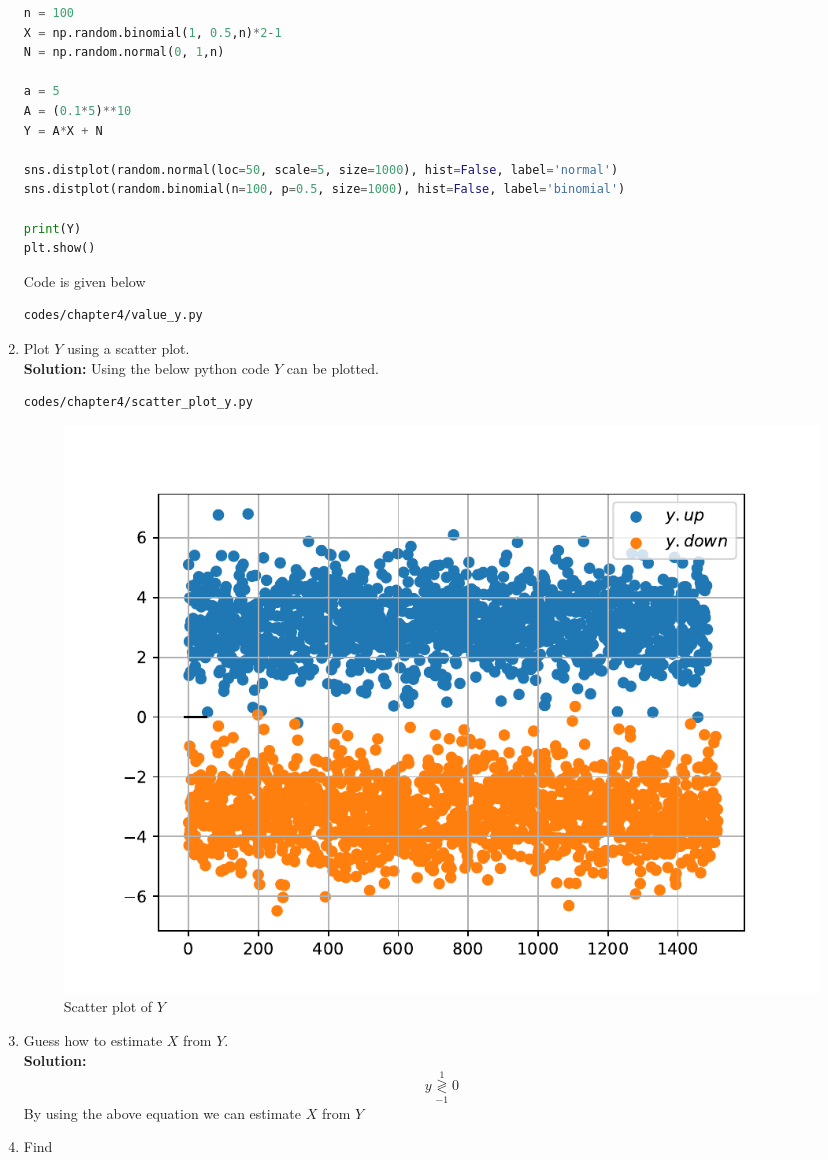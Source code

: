 \documentclass[journal,15pt,twocolumn]{IEEEtran}
\newcommand{\solution}{\noindent \textbf{Solution: }}
\providecommand{\dec}[2]{\ensuremath{\overset{#1}{\underset{#2}{\gtrless}}}}
\begin{document}
\begin{enumerate}
\begin{lstlisting}[language=python]
n = 100
X = np.random.binomial(1, 0.5,n)*2-1
N = np.random.normal(0, 1,n)

a = 5
A = (0.1*5)**10
Y = A*X + N

sns.distplot(random.normal(loc=50, scale=5, size=1000), hist=False, label='normal')
sns.distplot(random.binomial(n=100, p=0.5, size=1000), hist=False, label='binomial')

print(Y)
plt.show()


\end{lstlisting}
Code is given below
\begin{lstlisting}
codes/chapter4/value_y.py
\end{lstlisting}
\item Plot $Y$ using a scatter plot.\\
\solution Using the below python code $Y$ can be plotted.
\begin{lstlisting}
codes/chapter4/scatter_plot_y.py
\end{lstlisting}
\begin{figure}[H]
\centering
\includegraphics[width=\columnwidth]{./figs/chapter4/scatter_plot_y.pdf}
\caption{Scatter plot of $Y$}
\label{fig:bpsk_scatter}
\end{figure}
\item Guess how to estimate $X$ from $Y$.\\
\solution 
\begin{equation}
y \dec{1}{-1} 0
\end{equation}
By using the above equation we can estimate $X$ from $Y$ 
\item Find 
\begin{equation}

\end{equation}
\end{enumerate}
\end{document}
